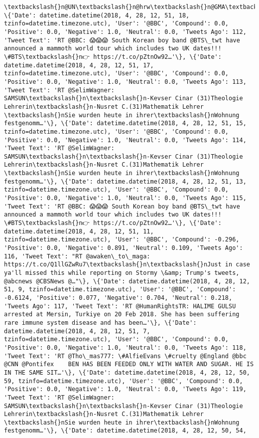 \documentclass[11pt]{article}
\begin{document}
\begin{Verbatim}[commandchars=\\\{\}]
\textbackslash{}n@UN\textbackslash{}n@hrw\textbackslash{}n@GMA\textbackslash{}n@JPN\_PMO\textbackslash{}n@DelhiAirp…'\}, \{'Date': datetime.datetime(2018, 4, 28, 12, 51, 18, tzinfo=datetime.timezone.utc), 'User': '@BBC', 'Compound': 0.0, 'Positive': 0.0, 'Negative': 1.0, 'Neutral': 0.0, 'Tweets Ago': 112, 'Tweet Text': 'RT @BBC: 😱😱😱 South Korean boy band @BTS\_twt have announced a mammoth world tour which includes two UK dates!!! \#BTS\textbackslash{}n👉 https://t.co/pZtnOw92…'\}, \{'Date': datetime.datetime(2018, 4, 28, 12, 51, 17, tzinfo=datetime.timezone.utc), 'User': '@BBC', 'Compound': 0.0, 'Positive': 0.0, 'Negative': 1.0, 'Neutral': 0.0, 'Tweets Ago': 113, 'Tweet Text': 'RT @SelimWagner: SAMSUN\textbackslash{}n\textbackslash{}n-Kevser Cinar (31)Theologie Lehrerin\textbackslash{}n-Nusret C.(31)Mathematik Lehrer \textbackslash{}nSie wurden heute in ihrer\textbackslash{}nWohnung festgenomm…'\}, \{'Date': datetime.datetime(2018, 4, 28, 12, 51, 15, tzinfo=datetime.timezone.utc), 'User': '@BBC', 'Compound': 0.0, 'Positive': 0.0, 'Negative': 1.0, 'Neutral': 0.0, 'Tweets Ago': 114, 'Tweet Text': 'RT @SelimWagner: SAMSUN\textbackslash{}n\textbackslash{}n-Kevser Cinar (31)Theologie Lehrerin\textbackslash{}n-Nusret C.(31)Mathematik Lehrer \textbackslash{}nSie wurden heute in ihrer\textbackslash{}nWohnung festgenomm…'\}, \{'Date': datetime.datetime(2018, 4, 28, 12, 51, 13, tzinfo=datetime.timezone.utc), 'User': '@BBC', 'Compound': 0.0, 'Positive': 0.0, 'Negative': 1.0, 'Neutral': 0.0, 'Tweets Ago': 115, 'Tweet Text': 'RT @BBC: 😱😱😱 South Korean boy band @BTS\_twt have announced a mammoth world tour which includes two UK dates!!! \#BTS\textbackslash{}n👉 https://t.co/pZtnOw92…'\}, \{'Date': datetime.datetime(2018, 4, 28, 12, 51, 11, tzinfo=datetime.timezone.utc), 'User': '@BBC', 'Compound': -0.296, 'Positive': 0.0, 'Negative': 0.891, 'Neutral': 0.109, 'Tweets Ago': 116, 'Tweet Text': "RT @awaken\_to\_maga: https://t.co/Q1llGZwRu7\textbackslash{}n\textbackslash{}nJust in case ya'll missed this while reporting on Stormy \&amp; Trump's tweets, @abcnews @CBSNews @…"\}, \{'Date': datetime.datetime(2018, 4, 28, 12, 51, 9, tzinfo=datetime.timezone.utc), 'User': '@BBC', 'Compound': -0.6124, 'Positive': 0.077, 'Negative': 0.704, 'Neutral': 0.218, 'Tweets Ago': 117, 'Tweet Text': 'RT @HumanRightsTR: HALIME GULSU arrested at Mersin, Turkiye on 20 Feb 2018. She has been suffering rare immune system disease and has been…'\}, \{'Date': datetime.datetime(2018, 4, 28, 12, 51, 7, tzinfo=datetime.timezone.utc), 'User': '@BBC', 'Compound': 0.0, 'Positive': 0.0, 'Negative': 1.0, 'Neutral': 0.0, 'Tweets Ago': 118, 'Tweet Text': 'RT @Tho\_mas777: \#AlfieEvans \#cruelty @England @bbc @CNN @Pontifex    BEN HAS BEEN FEEDED ONLY WITH WATER AND SUGAR. HE IS IN THE SAME SIT…'\}, \{'Date': datetime.datetime(2018, 4, 28, 12, 50, 59, tzinfo=datetime.timezone.utc), 'User': '@BBC', 'Compound': 0.0, 'Positive': 0.0, 'Negative': 1.0, 'Neutral': 0.0, 'Tweets Ago': 119, 'Tweet Text': 'RT @SelimWagner: SAMSUN\textbackslash{}n\textbackslash{}n-Kevser Cinar (31)Theologie Lehrerin\textbackslash{}n-Nusret C.(31)Mathematik Lehrer \textbackslash{}nSie wurden heute in ihrer\textbackslash{}nWohnung festgenomm…'\}, \{'Date': datetime.datetime(2018, 4, 28, 12, 50, 54, 
\end{Verbatim}
\end{document}
